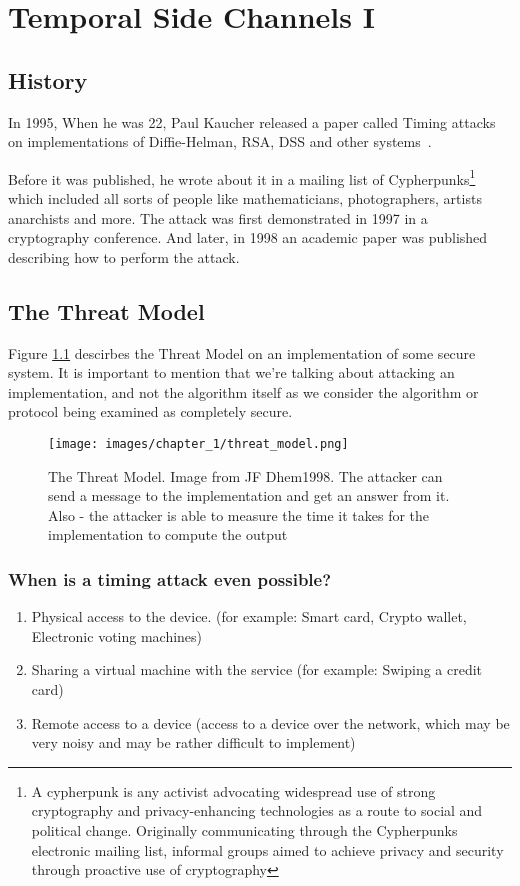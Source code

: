 \chapter{Temporal Side Channels I} 

\section{History}
In 1995, When he was 22, Paul Kaucher released a paper called Timing attacks on
implementations of Diffie-Helman, RSA, DSS and other
systems~\cite{kocher1996timing}.

Before it was published, he wrote about it in a mailing list of
Cypherpunks\footnote{A cypherpunk is any activist advocating widespread use of
strong cryptography and privacy-enhancing technologies as a route to social and
political change. Originally communicating through the Cypherpunks electronic
mailing list, informal groups aimed to achieve privacy and security through
proactive use of cryptography} which included all sorts of people like
mathematicians, photographers, artists anarchists and more. The attack was first
demonstrated in 1997 in a cryptography conference. And later, in 1998 an
academic paper was published describing how to perform the attack.



\section{The Threat Model}
Figure \ref{c1_fig_threat_model} descirbes the Threat Model on an implementation
of some secure system. It is important to mention that we're talking about
attacking an implementation, and not the algorithm itself as we consider the
algorithm or protocol being examined as completely secure.

\begin{figure}[H]
    \centering
    \texttt{[image: images/chapter\_1/threat\_model.png]}
    \caption{The Threat Model. Image from JF Dhem1998. The attacker can send a
     message to the implementation and get an answer from it. Also - the
     attacker is able to measure the time it takes for the implementation to
     compute the output}
    \label{c1_fig_threat_model}
\end{figure}

\subsection{When is a timing attack even possible?}
\begin{enumerate}
    \item Physical access to the device. (for example: Smart card, Crypto
    wallet, Electronic voting machines)
    \item Sharing a virtual machine with the service (for example: Swiping a
    credit card)
    \item Remote access to a device (access to a device over the network, which
    may be very noisy and may be rather difficult to implement)
\end{enumerate}

